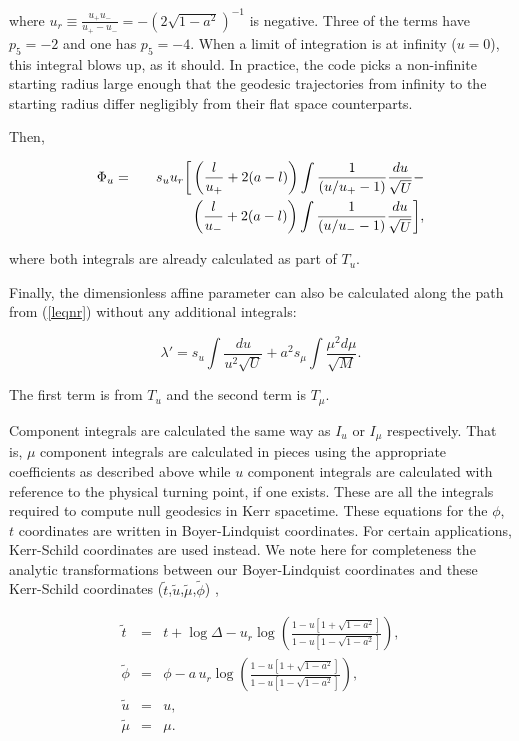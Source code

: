 \documentclass[apj]{emulateapj}
\begin{document}
\noindent where $u_r \equiv \frac{u_+ u_-}{u_+-u_-}=-(2\sqrt{1-a^2})^{-1}$ is negative. Three of the terms have $p_5=-2$ and one has $p_5=-4$. When a limit of integration is at infinity ($u=0$), this integral blows up, as it should. In practice, the code picks a non-infinite starting radius large enough that the geodesic trajectories from infinity to the starting radius differ negligibly from their flat space counterparts.

Then,

\begin{eqnarray}
\Phi_u&=&s_u u_r \bigg{[} \left (\frac{l}{u_+}+2(a-l) \right)\int\frac{1}{(u/u_+-1)}\frac{du}{\sqrt{U}}-\nonumber\\
 &\qquad&\qquad  \left ( \frac{l}{u_-}+2(a-l)\right)\int\frac{1}{(u/u_--1)}\frac{du}{\sqrt{U}}\bigg{]},
\end{eqnarray}

\noindent where both integrals are already calculated as part of $T_u$.

Finally, the dimensionless affine parameter can also be calculated along the path from (\ref{leqnr}) without any additional integrals:

\begin{equation}\label{leqn}
 \lambda'=s_u\int\frac{du}{u^2\sqrt{U}} + a^2 s_\mu\int\frac{\mu^2 d\mu}{\sqrt{M}}.
\end{equation}

\noindent The first term is from $T_u$ and the second term is $T_\mu$.

Component integrals are calculated the same way as $I_u$ or $I_\mu$ respectively. That is, $\mu$ component integrals are calculated in pieces using the appropriate coefficients as described above while $u$ component integrals are calculated with reference to the physical turning point, if one exists. These are all the integrals required to compute null geodesics in Kerr spacetime. These equations for the $\phi$, $t$ coordinates are written in Boyer-Lindquist coordinates. For certain applications, Kerr-Schild coordinates are used instead. We note here for completeness the analytic transformations between our Boyer-Lindquist coordinates and these Kerr-Schild coordinates ($\tilde{t}$,$\tilde{u}$,$\tilde{\mu}$,$\tilde{\phi}$) \citep{font1999},

\begin{eqnarray}
  \tilde{t}&=& t+\log{\Delta}-u_r \log{\left(\frac{1-u[1+\sqrt{1-a^2}]}{1-u[1-\sqrt{1-a^2}]}\right)},\\
  \tilde{\phi}&=&\phi-a \hspace{2pt} u_r \log{\left(\frac{1-u[1+\sqrt{1-a^2}]}{1-u[1-\sqrt{1-a^2}]}\right)}, \\
  \tilde{u}&=&u, \\
  \tilde{\mu}&=&\mu.
\end{eqnarray}
\end{document}
